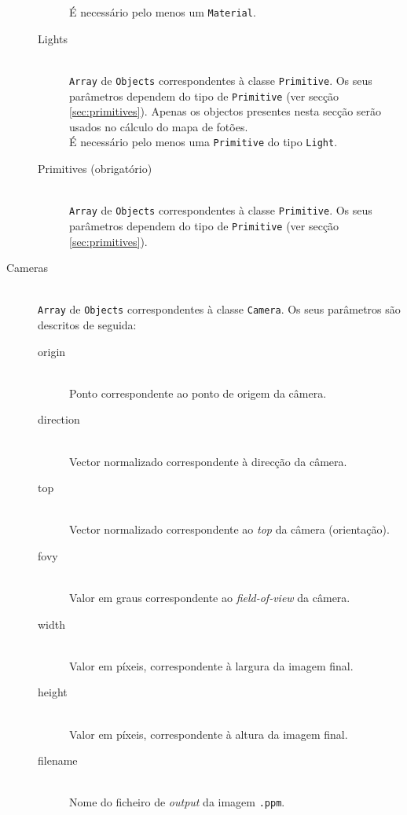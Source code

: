 \documentclass[a4paper]{article}
\begin{document}
\begin{description}
\begin{description}
				É necessário pelo menos um \texttt{Material}.
			\item[Lights] \hfill \\
				\texttt{Array} de \texttt{Objects} correspondentes à classe \texttt{Primitive}.
				Os seus parâmetros dependem do tipo de \texttt{Primitive} (ver secção \ref{sec:primitives}).
				Apenas os objectos presentes nesta secção serão usados no cálculo do mapa de fotões. \\
				É necessário pelo menos uma \texttt{Primitive} do tipo \texttt{Light}.
			\item[Primitives (obrigatório)] \hfill \\
				\texttt{Array} de \texttt{Objects} correspondentes à classe \texttt{Primitive}.
				Os seus parâmetros dependem do tipo de \texttt{Primitive} (ver secção \ref{sec:primitives}).
		\end{description}
	\item[Cameras] \hfill \\
		\texttt{Array} de \texttt{Objects} correspondentes à classe \texttt{Camera}.
		Os seus parâmetros são descritos de seguida:
		\begin{description}
			\item[origin] \hfill \\
				Ponto correspondente ao ponto de origem da câmera.
			\item[direction] \hfill \\
				Vector normalizado correspondente à direcção da câmera.
			\item[top] \hfill \\
				Vector normalizado correspondente ao \emph{top} da câmera (orientação).
			\item[fovy] \hfill \\
				Valor em graus correspondente ao \textit{field-of-view} da câmera.
			\item[width] \hfill \\
				Valor em píxeis, correspondente à largura da imagem final.
			\item[height] \hfill \\
				Valor em píxeis, correspondente à altura da imagem final.
			\item[filename] \hfill \\
				Nome do ficheiro de \textit{output} da imagem \texttt{.ppm}.
		\end{description}


\end{description}
\end{document}
